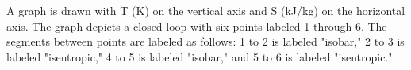 A graph is drawn with T (K) on the vertical axis and S (kJ/kg) on the horizontal axis. The graph depicts a closed loop with six points labeled 1 through 6. The segments between points are labeled as follows: 1 to 2 is labeled "isobar," 2 to 3 is labeled "isentropic," 4 to 5 is labeled "isobar," and 5 to 6 is labeled "isentropic."